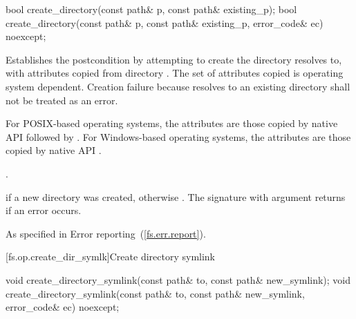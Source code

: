 %
\begin{itemdecl}
bool create_directory(const path& p, const path& existing_p);
bool create_directory(const path& p, const path& existing_p, error_code& ec) noexcept;
\end{itemdecl}

\begin{itemdescr}
\pnum
\effects Establishes the postcondition by attempting to create the
  directory  resolves to, with
  attributes copied from directory . The set of attributes
  copied is operating system dependent. Creation failure because  resolves to an existing directory shall not be
  treated as an error.
\begin{note} For POSIX-based operating systems, the
      attributes are those copied by native API 
      followed by . For
      Windows-based operating systems, the attributes are those copied by native
      API .
\end{note}

\pnum
\postcondition {}.

\pnum
\returns {} if a new directory was created, otherwise .
  The signature with argument  returns  if an error occurs.

\pnum
\throws As specified in Error reporting~(\ref{fs.err.report}).
\end{itemdescr}


[fs.op.create_dir_symlk]{Create directory symlink}

%
\begin{itemdecl}
void create_directory_symlink(const path& to, const path& new_symlink);
void create_directory_symlink(const path& to, const path& new_symlink,
                              error_code& ec) noexcept;
\end{itemdecl}

